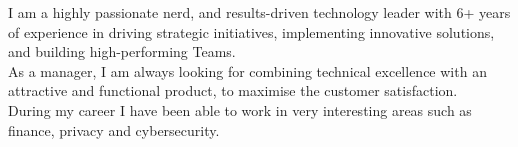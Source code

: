 
\begin{cvparagraph}
    I am a highly passionate nerd, and results-driven technology leader with 6+ years of experience in driving strategic initiatives, implementing innovative solutions, and building high-performing Teams.
    \\As a manager, I am always looking for combining technical excellence with an attractive and functional product, to maximise the customer satisfaction.
    \\During my career I have been able to work in very interesting areas such as finance, privacy and cybersecurity.
\end{cvparagraph}